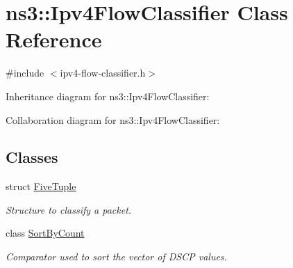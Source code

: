 \hypertarget{classns3_1_1Ipv4FlowClassifier}{}\section{ns3\+:\+:Ipv4\+Flow\+Classifier Class Reference}
\label{classns3_1_1Ipv4FlowClassifier}


{\ttfamily \#include $<$ipv4-\/flow-\/classifier.\+h$>$}



Inheritance diagram for ns3\+:\+:Ipv4\+Flow\+Classifier\+:


Collaboration diagram for ns3\+:\+:Ipv4\+Flow\+Classifier\+:
\subsection*{Classes}
\begin{DoxyCompactItemize}
\item 
struct \hyperlink{structns3_1_1Ipv4FlowClassifier_1_1FiveTuple}{Five\+Tuple}
\begin{DoxyCompactList}\small\item\em Structure to classify a packet. \end{DoxyCompactList}\item 
class \hyperlink{classns3_1_1Ipv4FlowClassifier_1_1SortByCount}{Sort\+By\+Count}
\begin{DoxyCompactList}\small\item\em Comparator used to sort the vector of D\+S\+CP values. \end{DoxyCompactList}\end{DoxyCompactItemize}
